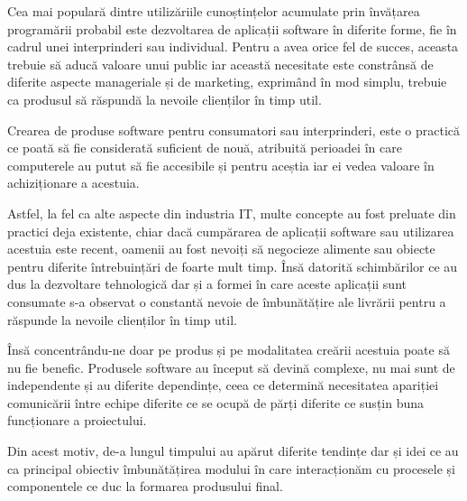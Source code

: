 Cea mai populară dintre utilizăriile cunoștințelor acumulate prin învățarea 
programării probabil este dezvoltarea de aplicații software în diferite forme, 
fie în cadrul unei interprinderi sau individual. Pentru a avea orice fel de succes,
aceasta trebuie să aducă valoare unui public iar această necesitate este constrânsă
de diferite aspecte manageriale și de marketing, exprimând în mod simplu, trebuie
ca produsul să răspundă la nevoile clienților în timp util.

Crearea de produse software pentru consumatori sau interprinderi, este o practică ce 
poată să fie considerată suficient de nouă, atribuită perioadei în care computerele 
au putut să fie accesibile și pentru aceștia iar ei vedea valoare în achiziționare 
a acestuia.

Astfel, la fel ca alte aspecte din industria IT, multe concepte au fost preluate
din practici deja existente, chiar dacă cumpărarea de aplicații software sau utilizarea
acestuia este recent, oamenii au fost nevoiți să negocieze alimente sau obiecte
pentru diferite întrebuințări de foarte mult timp. Însă datorită schimbărilor
ce au dus la dezvoltare tehnologică dar și a formei în care aceste aplicații sunt consumate
s-a observat o constantă nevoie de îmbunătățire ale livrării pentru a 
răspunde la nevoile clienților în timp util.

Însă concentrându-ne doar pe produs și pe modalitatea creării acestuia poate să
nu fie benefic. Produsele software au început să devină complexe, nu mai sunt
de independente și au diferite dependințe, ceea ce determină necesitatea apariției
comunicării între echipe diferite ce se ocupă de părți diferite ce susțin
buna funcționare a proiectului.

Din acest motiv, de-a lungul timpului au apărut diferite tendințe dar și idei 
ce au ca principal obiectiv îmbunătățirea modului în care interacționăm cu procesele
și componentele ce duc la formarea produsului final. 